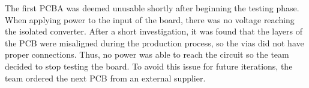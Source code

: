 The first PCBA was deemed unusable shortly after beginning the 
testing phase. When applying power to the input of the board, 
there was no voltage reaching the isolated converter. After a 
short investigation, it was found that the layers of the PCB 
were misaligned during the production process, so the vias did 
not have proper connections. Thus, no power was able to reach the 
circuit so the team decided to stop testing 
the board. To avoid this issue for future iterations, the team 
ordered the next PCB from an external supplier. 
